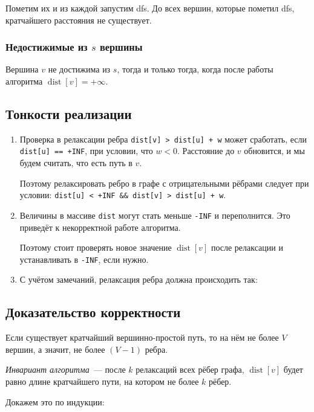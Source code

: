 \documentclass[a4paper,12pt]{article}
\DeclareMathOperator{\dist}{dist}
\begin{document}
      Пометим их и из каждой запустим dfs. До всех вершин,
      которые пометил dfs, кратчайшего расстояния не существует.
      
      
      \subsubsection{Недостижимые из $s$ вершины}
      Вершина $v$ не достижима из $s$, тогда и только тогда,
      когда после работы алгоритма $\dist[v] = +\infty$.
      
    \subsection{Тонкости реализации}
    \begin{enumerate}
    \item Проверка в релаксации ребра \texttt{dist[v] > dist[u] + w} может сработать,
          если \texttt{dist[u] == +INF}, при условии, что $w < 0$.
          Расстояние до $v$ обновится, и мы будем считать, что есть путь в $v$.
          
          Поэтому релаксировать ребро в графе с отрицательными рёбрами
          следует при условии: \texttt{dist[u] < +INF \&\& dist[v] > dist[u] + w}.
    \item Величины в массиве \texttt{dist} могут стать меньше \texttt{-INF}
          и переполнится. Это приведёт к некорректной работе алгоритма.
          
          Поэтому стоит проверять новое значение $\dist[v]$ после релаксации и
          устанавливать в \texttt{-INF}, если нужно.
    \item С учётом замечаний, релаксация ребра должна происходить так:
         
    \end{enumerate}

    \subsection{Доказательство корректности}
    Если существует кратчайший вершинно-простой путь, то на нём не более $V$ вершин,
    а значит, не более $(V - 1)$ ребра.
    
    \emph{Инвариант алгоритма}~--- после $k$ релаксаций всех рёбер графа,
    $\dist[v]$ будет равно длине кратчайшего пути, на котором не более $k$ рёбер.
    
    Докажем это по индукции:
\end{document}
